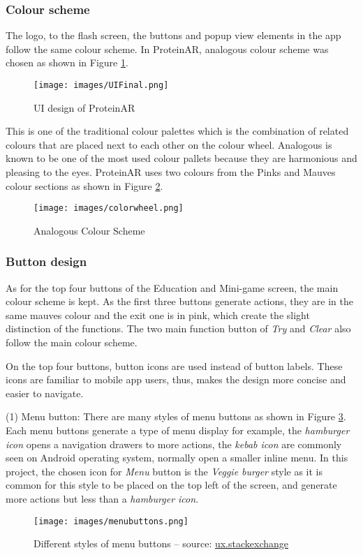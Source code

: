 \subsubsection{Colour scheme}
The logo, to the flash screen, the buttons and popup view elements in the app follow the same colour scheme. In ProteinAR, analogous colour scheme was chosen as shown in Figure \ref{fig:UIFinal}. 
\begin{figure}[hbt!]
	\centering
	\texttt{[image: images/UIFinal.png]}
	\caption{UI design of ProteinAR}
	\label{fig:UIFinal}
\end{figure}

This is one of the traditional colour palettes which is the combination of related colours that are placed next to each other on the colour wheel. Analogous is known to be one of the most used colour pallets because they are harmonious and pleasing to the eyes. ProteinAR uses two colours from the Pinks and Mauves colour sections as shown in Figure \ref{fig:colorwheel}. 
\begin{figure}[hbt!]
	\centering
	\texttt{[image: images/colorwheel.png]}
	\caption{Analogous Colour Scheme}
	\label{fig:colorwheel}
\end{figure}


\subsubsection{Button design}
As for the top four buttons of the Education and Mini-game screen, the main colour scheme is kept. As the first three buttons generate actions, they are in the same mauves colour and the exit one is in pink, which create the slight distinction of the functions. The two main function button of \emph{Try} and \emph{Clear} also follow the main colour scheme. 

On the top four buttons, button icons are used instead of button labels. These icons are familiar to mobile app users, thus, makes the design more concise and easier to navigate. 

(1) Menu button: There are many styles of menu buttons as shown in Figure \ref{fig:menubuttons}. Each menu buttons generate a type of menu display for example, the \emph{hamburger icon} opens a navigation drawers to more actions, the \emph{kebab icon} are commonly seen on Android operating system, normally open a smaller inline menu. In this project, the chosen icon for \emph{Menu} button is the \emph{Veggie burger} style as it is common for this style to be placed on the top left of the screen, and generate more actions but less than a \emph{hamburger icon}.
\begin{figure}[hbt!]
	\centering
	\texttt{[image: images/menubuttons.png]}
	\caption{Different styles of menu buttons – source: \href{https://ux.stackexchange.com/questions/115468/what-the-difference-between-the-2-menu-icons-3-dots-kebab-and-3-lines-hambur}{ux.stackexchange}}
	\label{fig:menubuttons}
\end{figure}

